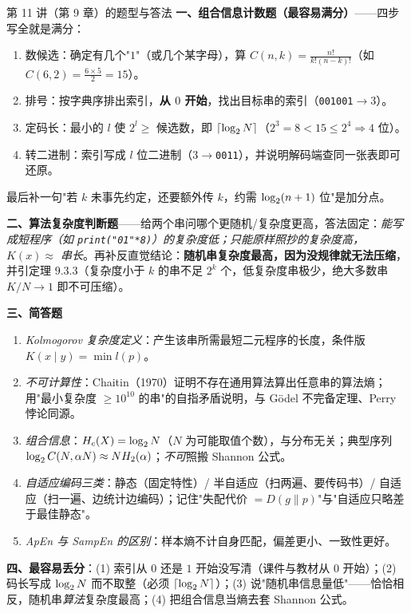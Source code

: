 \begin{exam}{第 11 讲（第 9 章）的题型与答法}
\textbf{一、组合信息计数题（最容易满分）}——四步写全就是满分：
\begin{enumerate}[leftmargin=1.6em,itemsep=1pt,topsep=2pt]
\item 数候选：确定有几个"$1$"（或几个某字母），算 $C(n,k)=\frac{n!}{k!(n-k)!}$（如 $C(6,2)=\frac{6\times5}{2}=15$）。
\item 排号：按字典序排出索引，\textbf{从 $0$ 开始}，找出目标串的索引（\texttt{001001}$\to3$）。
\item 定码长：最小的 $l$ 使 $2^l\ge$ 候选数，即 $\lceil\log_{2} N\rceil$（$2^3=8<15\le2^4\Rightarrow4$ 位）。
\item 转二进制：索引写成 $l$ 位二进制（$3\to$\texttt{0011}），并说明解码端查同一张表即可还原。
\end{enumerate}
最后补一句"若 $k$ 未事先约定，还要额外传 $k$，约需 $\log_{2}(n+1)$ 位"是加分点。

\textbf{二、算法复杂度判断题}——给两个串问哪个更随机/复杂度更高，答法固定：\emph{能写成短程序（如 \texttt{print("01"*8)}）的复杂度低；只能原样照抄的复杂度高，$K(x)\approx$ 串长}。再补反直觉结论：\textbf{随机串复杂度最高，因为没规律就无法压缩}，并引定理 9.3.3（复杂度小于 $k$ 的串不足 $2^k$ 个，低复杂度串极少，绝大多数串 $K/N\to1$ 即不可压缩）。

\textbf{三、简答题}
\begin{enumerate}[leftmargin=1.6em,itemsep=1pt,topsep=2pt]
\item \emph{Kolmogorov 复杂度定义}：产生该串所需最短二元程序的长度，条件版 $K(x\mid y)=\min l(p)$。
\item \emph{不可计算性}：Chaitin（1970）证明不存在通用算法算出任意串的算法熵；用"最小复杂度 $\ge10^{10}$ 的串"的自指矛盾说明，与 Gödel 不完备定理、Perry 悖论同源。
\item \emph{组合信息}：$H_c(X)=\log_{2} N$（$N$ 为可能取值个数），与分布无关；典型序列 $\log_{2} C(N,\alpha N)\approx NH_2(\alpha)$；\emph{不可}照搬 Shannon 公式。
\item \emph{自适应编码三类}：静态（固定特性）/ 半自适应（扫两遍、要传码书）/ 自适应（扫一遍、边统计边编码）；记住"失配代价 $=D(g\|p)$"与"自适应只略差于最佳静态"。
\item \emph{ApEn 与 SampEn 的区别}：样本熵不计自身匹配，偏差更小、一致性更好。
\end{enumerate}

\textbf{四、最容易丢分}：(1) 索引从 $0$ 还是 $1$ 开始没写清（课件与教材从 $0$ 开始）；(2) 码长写成 $\log_{2} N$ 而不取整（必须 $\lceil\log_{2} N\rceil$）；(3) 说"随机串信息量低"——恰恰相反，随机串\emph{算法}复杂度最高；(4) 把组合信息当熵去套 Shannon 公式。
\end{exam}
